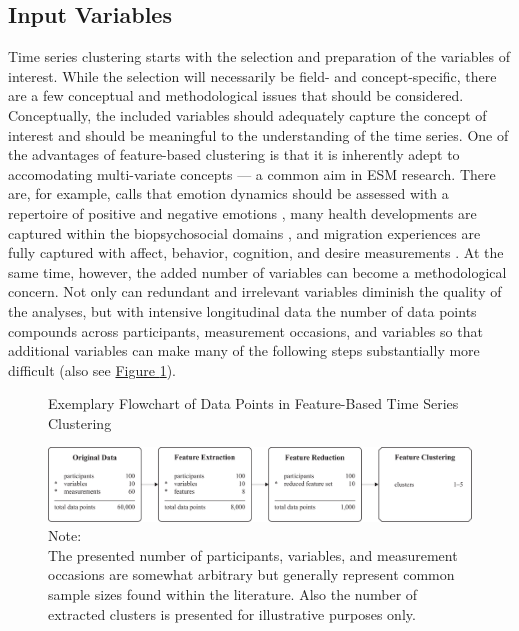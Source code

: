 \documentclass[man, 12pt, a4paper, mask, floatsintext]{apa7}
\theoremstyle{break}
\theoremstyle{plain}
\newcommand{\fgrref}[2][]{\hyperref[#2]{Figure \ref*{#2}#1}}
\begin{document}
\subsection{Input Variables}
Time series clustering starts with the selection and preparation of the variables of interest. While the selection will necessarily be field- and concept-specific, there are a few conceptual and methodological issues that should be considered. Conceptually, the included variables should adequately capture the concept of interest and should be meaningful to the understanding of the time series. One of the advantages of feature-based clustering is that it is inherently adept to accomodating multi-variate concepts --- a common aim in ESM research. There are, for example, calls that emotion dynamics should be assessed with a repertoire of positive and negative emotions \citep[e.g.,][]{dejonckheere2019}, many health developments are captured within the biopsychosocial domains \citep[e.g.,][]{suls2004}, and migration experiences are fully captured with affect, behavior, cognition, and desire measurements \citep[e.g.,][]{Kreienkamp2022d}. At the same time, however, the added number of variables can become a methodological concern. Not only can redundant and irrelevant variables diminish the quality of the analyses, but with intensive longitudinal data the number of data points compounds across participants, measurement occasions, and variables so that additional variables can make many of the following steps substantially more difficult (also see \fgrref{fig:TSCFlowN}). 

\begin{figure}[!ht] %
  \caption{Exemplary Flowchart of Data Points in Feature-Based Time Series Clustering}
  \label{fig:TSCFlowN}
  \centering\includegraphics[width=\textwidth]{figures/TS Cluster Flow/tsClustFlowN.pdf}
  \caption*{Note: \\
  The presented number of participants, variables, and measurement occasions are somewhat arbitrary but generally represent common sample sizes found within the literature. Also the number of extracted clusters is presented for illustrative purposes only.}
\end{figure}


\end{document}
